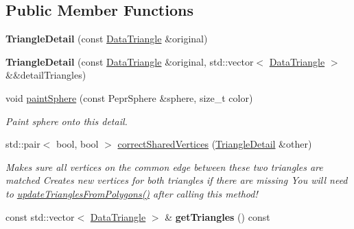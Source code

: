 \subsection*{Public Member Functions}
\begin{DoxyCompactItemize}
\item 
\mbox{\label{classpepr3d_1_1_triangle_detail_a33380ae8d2798829b809316ceb653b4c}} 
{\bfseries Triangle\+Detail} (const \mbox{\hyperlink{classpepr3d_1_1_data_triangle}{Data\+Triangle}} \&original)
\item 
\mbox{\label{classpepr3d_1_1_triangle_detail_a6ee0775d745d0ec5d0a256dc6c320674}} 
{\bfseries Triangle\+Detail} (const \mbox{\hyperlink{classpepr3d_1_1_data_triangle}{Data\+Triangle}} \&original, std\+::vector$<$ \mbox{\hyperlink{classpepr3d_1_1_data_triangle}{Data\+Triangle}} $>$ \&\&detail\+Triangles)
\item 
\mbox{\label{classpepr3d_1_1_triangle_detail_ab026253f9eed3d2752baf31e8eef6ef3}} 
void \mbox{\hyperlink{classpepr3d_1_1_triangle_detail_ab026253f9eed3d2752baf31e8eef6ef3}{paint\+Sphere}} (const Pepr\+Sphere \&sphere, size\+\_\+t color)
\begin{DoxyCompactList}\small\item\em Paint sphere onto this detail. \end{DoxyCompactList}\item 
std\+::pair$<$ bool, bool $>$ \mbox{\hyperlink{classpepr3d_1_1_triangle_detail_a30215d8b668385e1f6c145545d9366f2}{correct\+Shared\+Vertices}} (\mbox{\hyperlink{classpepr3d_1_1_triangle_detail}{Triangle\+Detail}} \&other)
\begin{DoxyCompactList}\small\item\em Makes sure all vertices on the common edge between these two triangles are matched Creates new vertices for both triangles if there are missing You will need to \mbox{\hyperlink{classpepr3d_1_1_triangle_detail_a55836364f8bca5dce29da4a7320adf65}{update\+Triangles\+From\+Polygons()}} after calling this method! \end{DoxyCompactList}\item 
\mbox{\label{classpepr3d_1_1_triangle_detail_af71efedfe287618fc844fbd2b68b0082}} 
const std\+::vector$<$ \mbox{\hyperlink{classpepr3d_1_1_data_triangle}{Data\+Triangle}} $>$ \& {\bfseries get\+Triangles} () const

\end{DoxyCompactItemize}
